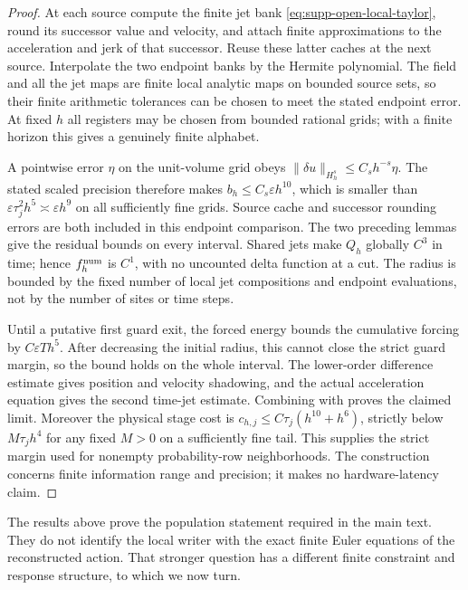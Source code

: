 \documentclass[11pt]{article}
\numberwithin{equation}{section}
\theoremstyle{definition}
\theoremstyle{remark}
\begin{document}
\begin{proof}
At each source compute the finite jet bank
\eqref{eq:supp-open-local-taylor}, round its successor value and velocity,
and attach finite approximations to the acceleration and jerk of that
successor.  Reuse these latter caches at the next source.  Interpolate the
two endpoint banks by the Hermite polynomial.  The field and all the jet
maps are finite local analytic maps on bounded source sets, so their finite
arithmetic tolerances can be chosen to meet the stated endpoint error.
At fixed $h$ all registers may be chosen from bounded rational grids; with
a finite horizon this gives a genuinely finite alphabet.

A pointwise error $\eta$ on the unit-volume grid obeys
$\|\delta u\|_{H_h^s}\le C_sh^{-s}\eta$.  The stated scaled precision
therefore makes $b_h\le C_s\varepsilon h^{10}$, which is smaller than
$\varepsilon\tau_j^2h^5\asymp\varepsilon h^9$ on all sufficiently fine
grids.  Source cache and successor rounding errors are both included in
this endpoint comparison.  The two preceding lemmas give the residual
bounds on every interval.  Shared jets make $Q_h$ globally $C^3$ in time;
hence $f_h^{\rm num}$ is $C^1$, with no uncounted delta function at a cut.
The radius is bounded by the fixed number of local jet compositions and
endpoint evaluations, not by the number of sites or time steps.

Until a putative first guard exit, the forced energy bounds the cumulative
forcing by $C\varepsilon Th^5$.  After decreasing the initial radius,
this cannot close the strict guard margin, so the bound holds on the whole
interval.  The lower-order difference estimate gives position and velocity
shadowing, and the actual acceleration equation gives the second time-jet
estimate.  Combining with 
proves the claimed limit.  Moreover the physical stage cost is
$c_{h,j}\le C\tau_j(h^{10}+h^6)$, strictly below $M\tau_jh^4$ for any
fixed $M>0$ on a sufficiently fine tail.  This supplies the strict margin
used for nonempty probability-row neighborhoods.  The construction concerns
finite information range and precision; it makes no hardware-latency claim.
\end{proof}

The results above prove the population statement required in the main text.
They do not identify the local writer with the exact finite Euler equations of
the reconstructed action.  That stronger question has a different finite
constraint and response structure, to which we now turn.
\end{document}
